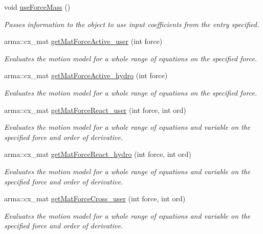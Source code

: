 \begin{DoxyCompactItemize}
void \hyperlink{classosea_1_1ofreq_1_1_motion_model_a1478e13916cc181bbedca771b6c83695}{use\-Force\-Mass} ()
\begin{DoxyCompactList}\small\item\em Passes information to the object to use input coefficients from the entry specified. \end{DoxyCompactList}\item 
arma\-::cx\-\_\-mat \hyperlink{classosea_1_1ofreq_1_1_motion_model_af9d30b6afa16093429fab496d18c5d00}{get\-Mat\-Force\-Active\-\_\-user} (int force)
\begin{DoxyCompactList}\small\item\em Evaluates the motion model for a whole range of equations on the specified force. \end{DoxyCompactList}\item 
arma\-::cx\-\_\-mat \hyperlink{classosea_1_1ofreq_1_1_motion_model_a56059a3d7f37c9dad5f906714ba159de}{get\-Mat\-Force\-Active\-\_\-hydro} (int force)
\begin{DoxyCompactList}\small\item\em Evaluates the motion model for a whole range of equations on the specified force. \end{DoxyCompactList}\item 
arma\-::cx\-\_\-mat \hyperlink{classosea_1_1ofreq_1_1_motion_model_a44e885c0255e74d82664c785499138f0}{get\-Mat\-Force\-React\-\_\-user} (int force, int ord)
\begin{DoxyCompactList}\small\item\em Evaluates the motion model for a whole range of equations and variable on the specified force and order of derivative. \end{DoxyCompactList}\item 
arma\-::cx\-\_\-mat \hyperlink{classosea_1_1ofreq_1_1_motion_model_af239389973af6d198a21ee0c07db19c6}{get\-Mat\-Force\-React\-\_\-hydro} (int force, int ord)
\begin{DoxyCompactList}\small\item\em Evaluates the motion model for a whole range of equations and variable on the specified force and order of derivative. \end{DoxyCompactList}\item 
arma\-::cx\-\_\-mat \hyperlink{classosea_1_1ofreq_1_1_motion_model_addbd875f2fc266823f645fc7f2d207e8}{get\-Mat\-Force\-Cross\-\_\-user} (int force, int ord)
\begin{DoxyCompactList}\small\item\em Evaluates the motion model for a whole range of equations and variable on the specified force and order of derivative. \end{DoxyCompactList}\item 

\end{DoxyCompactItemize}
